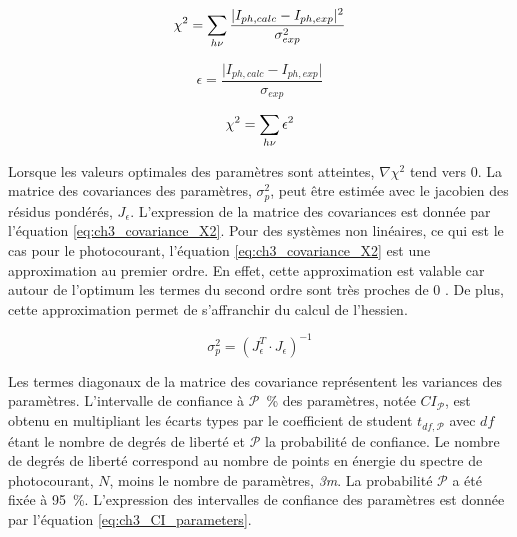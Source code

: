 \begin{refsection}
    \begin{equation}
        \chi ^2 = \sum _{h\nu} \frac{\vert I_{ph,calc} - I_{ph,exp} \vert ^2 }{ \sigma _{exp} ^2}\\
        \label{eq:ch3_chi2}
    \end{equation}

    \begin{equation}
        \epsilon = \frac{\vert I_{ph,calc} - I_{ph,exp} \vert}{\sigma _{exp}}
        \label{eq:ch3_complex_residuals_X2}
    \end{equation}

     \begin{equation}
            \chi ^2 = \sum _{h\nu} \epsilon ^2 
        \label{eq:ch3_chi2_vs_eps}
    \end{equation}

    Lorsque les valeurs optimales des paramètres sont atteintes, $\nabla \chi ^2$ tend vers 0.
    La matrice des covariances des paramètres, $\sigma _p^2$, peut être estimée avec le jacobien des
    résidus pondérés, $J_{\epsilon}$. 
    L'expression de la matrice des covariances est donnée par l'équation \ref{eq:ch3_covariance_X2}. 
    Pour des systèmes non linéaires, ce qui est le cas pour le photocourant, l'équation \ref{eq:ch3_covariance_X2} est
    une approximation au premier ordre. En effet, cette approximation est valable car autour de l'optimum les termes du
    second ordre sont très proches de 0 \citep{Press2007}. De plus, cette approximation permet de s'affranchir du calcul
    de l'hessien.

    \begin{equation}
            \sigma _p ^2 = (J_{\epsilon}^T \cdot J_{\epsilon})^{-1} 
        \label{eq:ch3_covariance_X2}
    \end{equation}

    Les termes diagonaux de la matrice des covariance représentent les variances des paramètres.
    L'intervalle de confiance à $\mathcal{P}$~\% des paramètres, notée $CI_{\mathcal{P}}$, est obtenu en multipliant
    les écarts types par le coefficient de student $t_{df,\mathcal{P}}$ avec $df$ étant le nombre de degrés de liberté
    et $\mathcal{P}$ la probabilité de confiance. 
    Le nombre de degrés de liberté correspond au nombre de points en énergie du spectre de
    photocourant, $N$, moins le nombre de paramètres, \emph{3m}.
    La probabilité $\mathcal{P}$ a été fixée à \SI{95}{\percent}.
    L'expression des intervalles de confiance des paramètres est donnée par l'équation \ref{eq:ch3_CI_parameters}.


\end{refsection}
